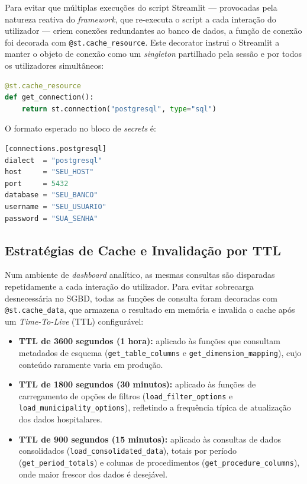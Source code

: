 \documentclass[12pt,a4paper]{report}
\begin{document}
Para evitar que múltiplas execuções do script Streamlit — provocadas pela natureza
reativa do \textit{framework}, que re-executa o script a cada interação do utilizador
— criem conexões redundantes ao banco de dados, a função de conexão foi decorada com
\texttt{@st.cache\_resource}. Este decorator instrui o Streamlit a manter o objeto de
conexão como um \textit{singleton} partilhado pela sessão e por todos os utilizadores
simultâneos:

\begin{lstlisting}[language=Python]
@st.cache_resource
def get_connection():
    return st.connection("postgresql", type="sql")
\end{lstlisting}

O formato esperado no bloco de \textit{secrets} é:

\begin{lstlisting}[language=Python, numbers=none]
[connections.postgresql]
dialect  = "postgresql"
host     = "SEU_HOST"
port     = 5432
database = "SEU_BANCO"
username = "SEU_USUARIO"
password = "SUA_SENHA"
\end{lstlisting}

\subsection{Estratégias de Cache e Invalidação por TTL}

Num ambiente de \textit{dashboard} analítico, as mesmas consultas são disparadas
repetidamente a cada interação do utilizador. Para evitar sobrecarga desnecessária no
SGBD, todas as funções de consulta foram decoradas com \texttt{@st.cache\_data}, que
armazena o resultado em memória e invalida o cache após um \textit{Time-To-Live} (TTL)
configurável:

\begin{itemize}
    \item \textbf{TTL de 3600 segundos (1 hora):} aplicado às funções que consultam
    metadados de esquema (\texttt{get\_table\_columns} e
    \texttt{get\_dimension\_mapping}), cujo conteúdo raramente varia em produção.
    \item \textbf{TTL de 1800 segundos (30 minutos):} aplicado às funções de
    carregamento de opções de filtros (\texttt{load\_filter\_options} e
    \texttt{load\_municipality\_options}), refletindo a frequência típica de
    atualização dos dados hospitalares.
    \item \textbf{TTL de 900 segundos (15 minutos):} aplicado às consultas de dados
    consolidados (\texttt{load\_consolidated\_data}), totais por período
    (\texttt{get\_period\_totals}) e colunas de procedimentos
    (\texttt{get\_procedure\_columns}), onde maior frescor dos dados é desejável.
\end{itemize}
\end{document}
